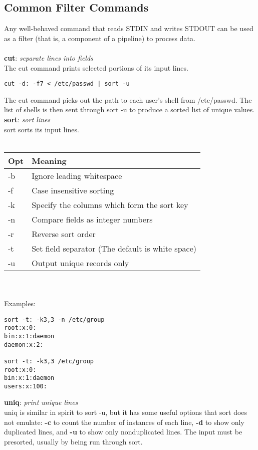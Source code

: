 \documentclass[10pt,letterpaper]{book}
\begin{document}
\subsection{Common Filter Commands}
Any well-behaved command that reads STDIN and writes STDOUT can be used
as a filter (that is, a component of a pipeline) to process data.\\
\\
\textbf{cut}: \textit{separate lines into fields}\\
The cut command prints selected portions of its input lines.\\
\begin{lstlisting}
cut -d: -f7 < /etc/passwd | sort -u
\end{lstlisting} 
The cut command picks out the path to each user's shell from /etc/passwd. The list of shells is then sent through sort -u to produce a sorted list of unique values.
\\
\textbf{sort}: \textit{sort lines}\\
sort sorts its input lines.\\
\\
\begin{tabular}{l l}
\hline
\textbf{Opt} & \textbf{Meaning}\\
\hline 
-b & Ignore leading whitespace\\
-f & Case insensitive sorting\\
-k & Specify the columns which form the sort key\\
-n & Compare fields as integer numbers\\
-r & Reverse sort order\\
-t & Set field separator (The default is white space)\\
-u & Output unique records only\\
\hline
\end{tabular}
\\
\\
Examples:
\begin{lstlisting}
sort -t: -k3,3 -n /etc/group
root:x:0:
bin:x:1:daemon
daemon:x:2:

sort -t: -k3,3 /etc/group
root:x:0:
bin:x:1:daemon
users:x:100:
\end{lstlisting}
\textbf{uniq}: \textit{print unique lines}\\
uniq is similar in spirit to sort -u, but it has some useful options that sort does not emulate: \textbf{-c} to count the number of instances of each line, \textbf{-d} to show only duplicated lines, and \textbf{-u} to show only nonduplicated lines. The input must be presorted, usually by being run through sort.\\
\end{document}
